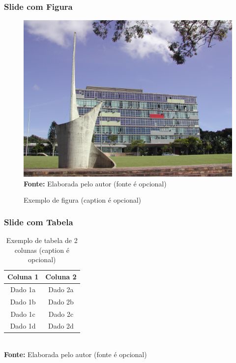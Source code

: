 \begin{frame}

    \frametitle{Slide com Figura}
    
    \begin{figure}[!htbp]
       	\centering
       	\caption{Exemplo de figura (caption é opcional)}
       	\includegraphics[scale=0.5]{imagens/exemploFigura}
        \\\small{\textbf{Fonte:} Elaborada pelo autor (fonte é opcional)}%
     \end{figure}
         
\end{frame}


\begin{frame}

    \frametitle{Slide com Tabela}
    
    \begin{table}[!htbp]
       	\centering
       	\caption{Exemplo de tabela de 2 colunas (caption é opcional)}
       	\begin{tabular}{ c | c }
       		\hline
       		\textbf{Coluna 1} & \textbf{Coluna 2} \\ \hline
       		Dado 1a           & Dado 2a           \\ \hline
       		Dado 1b           & Dado 2b           \\ \hline
       		Dado 1c           & Dado 2c           \\ \hline
       		Dado 1d           & Dado 2d           \\ \hline
       	\end{tabular}
       	\\ \vspace{0.2cm}
       	\small{\textbf{Fonte:} Elaborada pelo autor (fonte é opcional)}%
     \end{table}
         
\end{frame}



